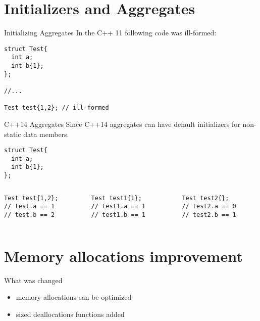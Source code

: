 \documentclass[10pt]{beamer}
\begin{document}
\section{Initializers and Aggregates}
\begin{frame}[fragile]{Initializing Aggregates}
	In the C++ 11 following code was ill-formed:
	\begin{verbatim}
struct Test{
  int a;
  int b{1};
};

//...

Test test{1,2}; // ill-formed
	\end{verbatim}
\end{frame}

\begin{frame}[fragile]{C++14 Aggregates}
	Since C++14 aggregates can have default initializers for non-static data members.

\begin{verbatim}
struct Test{
  int a;
  int b{1};
};
\end{verbatim}
\vfill

	\begin{columns}
	\begin{column}{0.3\linewidth}
	\begin{verbatim}	
Test test{1,2};
// test.a == 1
// test.b == 2
	\end{verbatim}
	\end{column} \pause
	\begin{column}{0.3\linewidth}
	\begin{verbatim}	
Test test1{1};
// test1.a == 1
// test1.b == 1	
	\end{verbatim}
	\end{column} \pause
	\begin{column}{0.3\linewidth}
	\begin{verbatim}	
Test test2{};
// test2.a == 0
// test2.b == 1
	\end{verbatim}
	\end{column}	
	\end{columns}
\end{frame}

\section{Memory allocations improvement}
\begin{frame}[fragile]{What was changed}
	\begin{itemize}[<+- |alert@+>]
		\item memory allocations can be optimized
		\item sized deallocations functions added
	\end{itemize}
\end{frame}
\end{document}
